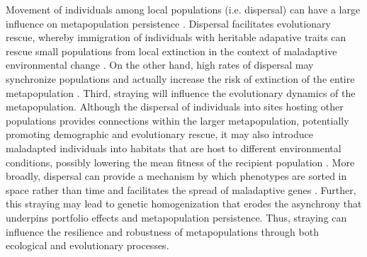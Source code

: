 \documentclass{revtex4}
\begin{document}
Movement of individuals among local populations (i.e. dispersal) can have a large influence on metapopulation persistence \citep{MilnerGulland:2011vm}. 
Dispersal facilitates evolutionary rescue, whereby immigration of individuals with heritable adapative traits can rescue small populations from local extinction in the context of maladaptive environmental change \citep{Bell:2011ki,Carlson:2014is}.
On the other hand, high rates of dispersal may synchronize populations and actually increase the risk of extinction of the entire metapopulation \citep{Earn:2000fm}. 
Third, straying will influence the evolutionary dynamics of the metapopulation.
Although the dispersal of individuals into sites hosting other populations provides connections within the larger metapopulation, potentially promoting demographic and evolutionary rescue, it may also introduce maladapted individuals into habitats that are host to different environmental conditions, possibly lowering the mean fitness of the recipient population \citep{Muhlfeld:2014hs}. 
More broadly, dispersal can provide a mechanism by which phenotypes are sorted in space rather than time and facilitates the spread of maladaptive genes \citep{Lowe:2015ft}.
Further, this straying may lead to genetic homogenization that erodes the asynchrony that underpins portfolio effects and metapopulation persistence. 
Thus, straying can influence the resilience and robustness of metapopulations through both ecological and evolutionary processes.
\end{document}
